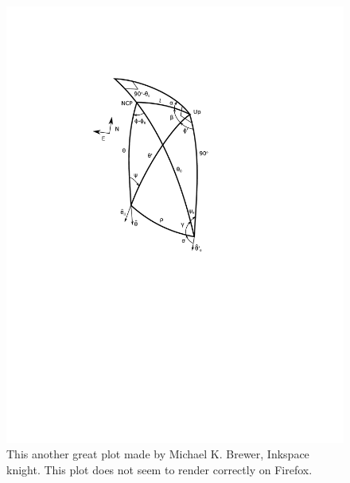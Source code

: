 \documentclass[a4paper,fleqn]{cas-dc}\sloppy
\begin{document}
\begin{figure}
	\centering
	\includegraphics[width=1.0\linewidth]{figures/PISCO_Drawing_print.pdf}
	\caption{This another great plot made by Michael K. Brewer, Inkspace knight. This plot does not seem to render correctly on Firefox.}
	\label{fig::piscodrawing_print}
\end{figure}


\end{document}
